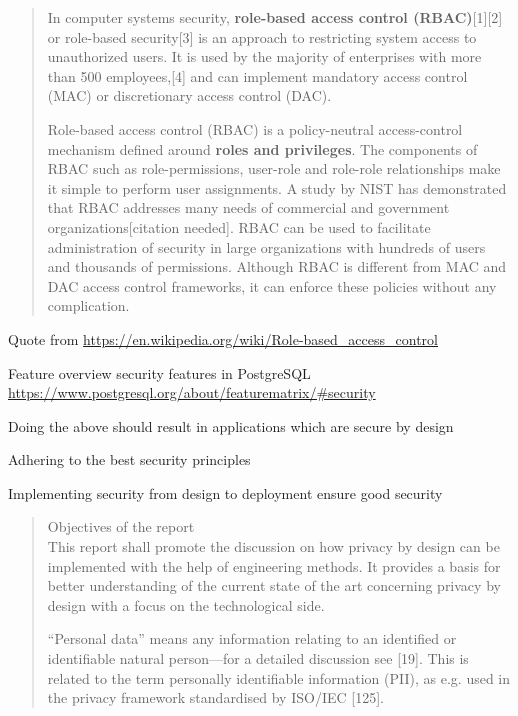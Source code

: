 \documentclass[Screen16to9,17pt]{foils}
\begin{document}
\begin{quote}
In computer systems security, {\bf role-based access control (RBAC)}[1][2] or role-based security[3] is an approach to restricting system access to unauthorized users. It is used by the majority of enterprises with more than 500 employees,[4] and can implement mandatory access control (MAC) or discretionary access control (DAC).

Role-based access control (RBAC) is a policy-neutral access-control mechanism defined around {\bf roles and privileges}. The components of RBAC such as role-permissions, user-role and role-role relationships make it simple to perform user assignments. A study by NIST has demonstrated that RBAC addresses many needs of commercial and government organizations[citation needed]. RBAC can be used to facilitate administration of security in large organizations with hundreds of users and thousands of permissions. Although RBAC is different from MAC and DAC access control frameworks, it can enforce these policies without any complication.
\end{quote}
Quote from \url{https://en.wikipedia.org/wiki/Role-based_access_control}




Feature overview security features in PostgreSQL\\
\url{https://www.postgresql.org/about/featurematrix/#security}




\begin{list2}
\item Doing the above should result in applications which are secure by design
\item Adhering to the best security principles
\item Implementing security from design to deployment ensure good security
\end{list2}



\begin{quote}
Objectives of the report\\
This report shall promote the discussion on how privacy by design can be implemented with the help
of engineering methods. It provides a basis for better understanding of the current state of the art
concerning privacy by design with a focus on the technological side.

“Personal data” means any information relating to an identified or identifiable natural person—for a
detailed discussion see [19]. This is related to the term personally identifiable information (PII), as e.g.
used in the privacy framework standardised by ISO/IEC [125].
\end{quote}
\end{document}
